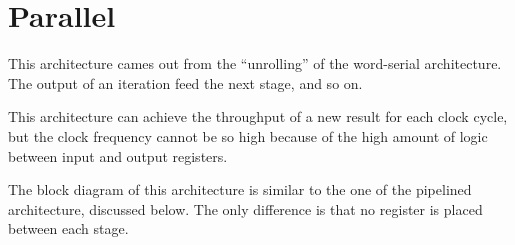 \section{Parallel}\label{sec:parallel}
This architecture cames out from the \enquote{unrolling} of the word-serial
architecture. The output of an iteration feed the next stage, and so on.

This architecture can achieve the throughput of a new result for each clock
cycle, but the clock frequency cannot be so high because of the high amount of
logic between input and output registers.

The block diagram of this architecture is similar to the one of the pipelined
architecture, discussed below. The only difference is that no register is placed
between each stage.
